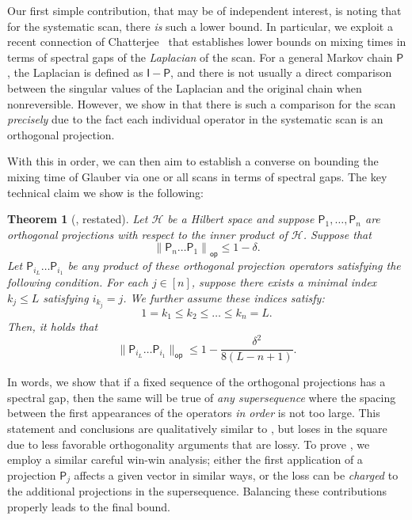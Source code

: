 \documentclass[11pt]{article}
\newtheorem{theorem}{Theorem}[section]
\begin{document}
Our first simple contribution, that may be of independent interest, is noting that for the systematic scan, there \emph{is} such a lower bound. In particular, we exploit  a recent connection of Chatterjee~\cite{chatterjee2023spectral} that establishes lower bounds on mixing times in terms of spectral gaps of the \emph{Laplacian} of the scan. For a general Markov chain $\mathsf{P}$, the Laplacian is defined as $\mathsf{I}-\mathsf{P}$, and there is not usually a direct comparison between the singular values of the Laplacian and the original chain when nonreversible. However, we show in  that there is such a comparison for the scan \emph{precisely} due to the fact each individual operator in the systematic scan is an orthogonal projection.

With this in order, we can then aim to establish a converse on bounding the mixing time of Glauber via one or all scans in terms of spectral gaps. The key technical claim we show is the following:

\begin{theorem}[, restated]
\label{thm:gap_intro_2}
        Let $\mathcal{H}$ be a Hilbert space and suppose $\mathsf{P}_1,\ldots, \mathsf{P}_n$ are orthogonal projections with respect to the inner product of $\mathcal{H}$. Suppose that
        \begin{equation}
    \left\|\mathsf{P}_n\ldots \mathsf{P}_1\right\|_{\mathsf{op}}\leq 1-\delta.
\end{equation} 
Let $\mathsf{P}_{i_L}\ldots \mathsf{P}_{i_1}$ be any product of these orthogonal projection operators satisfying the following condition. For each $j\in [n]$, suppose there exists a minimal index $k_j\leq L$ satisfying $i_{k_j}=j$. We further assume these indices satisfy:
\begin{equation}
\label{eq:order_2}
        1=k_1\leq k_2\leq\ldots\leq k_n=L.
\end{equation}
Then, it holds that
\begin{equation*}
    \|\mathsf{P}_{i_L}\ldots \mathsf{P}_{i_1}\|_{\mathsf{op}}\leq 1-\frac{\delta^2}{8(L-n+1)}.
\end{equation*}
\end{theorem}
In words, we show that if a fixed sequence of the orthogonal projections has a spectral gap, then the same will be true of \emph{any supersequence} where the spacing between the first appearances of the operators \emph{in order} is not too large. This statement and conclusions are qualitatively similar to , but loses in the square due to less favorable orthogonality arguments that are lossy. To prove , we employ a similar careful win-win analysis; either the first application of a projection $\mathsf{P}_j$ affects a given vector in similar ways, or the loss can be \emph{charged} to the additional projections in the supersequence. Balancing these contributions properly leads to the final bound.
\end{document}
